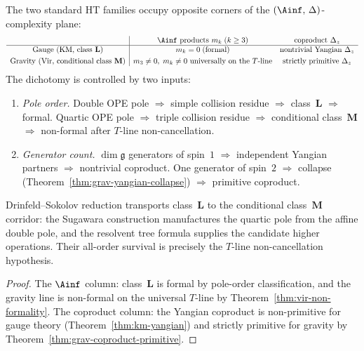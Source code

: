 \begin{corollary}
\label{cor:gauge-gravity-dichotomy-ordered}
The two standard HT families occupy opposite corners of the
$(\Ainf,\,\Delta)$-complexity plane:
\[
\begin{array}{c|cc}
& \Ainf\textup{ products } m_k\;(k \ge 3) &
 \textup{coproduct } \Delta_z \\
\hline
\textup{Gauge \textup{(}KM, class~$\mathbf{L}$\textup{)}}
 & m_k = 0\;\textup{(formal)}
 & \textup{nontrivial Yangian } \Delta_z \\[3pt]
\textup{Gravity \textup{(}Vir, conditional class~$\mathbf{M}$\textup{)}}
 & m_3\neq0,\;m_k\neq0\ \textup{universally on the }T\textup{-line}
 & \textup{strictly primitive } \Delta_z
\end{array}
\]
The dichotomy is controlled by two inputs:
\begin{enumerate}[label=\textup{(\arabic*)}]
\item \emph{Pole order.}\enspace
Double OPE pole $\Rightarrow$ simple collision residue
$\Rightarrow$ class~$\mathbf{L}$ $\Rightarrow$ formal.
Quartic OPE pole $\Rightarrow$ triple collision residue
$\Rightarrow$ conditional class~$\mathbf{M}$ $\Rightarrow$
non-formal after $T$-line non-cancellation.

\item \emph{Generator count.}\enspace
$\dim\mathfrak{g}$ generators of spin~$1$
$\Rightarrow$ independent Yangian partners
$\Rightarrow$ nontrivial coproduct.
One generator of spin~$2$
$\Rightarrow$ collapse
\textup{(}Theorem~\textup{\ref{thm:grav-yangian-collapse})}
$\Rightarrow$ primitive coproduct.
\end{enumerate}
Drinfeld--Sokolov reduction transports class~$\mathbf{L}$ to
the conditional class~$\mathbf{M}$ corridor: the Sugawara construction
manufactures the quartic pole from the affine double pole, and the
resolvent tree formula supplies the candidate higher operations. Their
all-order survival is precisely the $T$-line non-cancellation
hypothesis.
\end{corollary}

\begin{proof}
The $\Ainf$ column: class~$\mathbf{L}$ is formal by pole-order
classification, and the gravity line is non-formal on the universal
$T$-line by Theorem~\ref{thm:vir-non-formality}. The coproduct column:
the
Yangian coproduct is non-primitive for gauge theory
(Theorem~\ref{thm:km-yangian}) and strictly primitive for
gravity by Theorem~\ref{thm:grav-coproduct-primitive}.
\end{proof}

